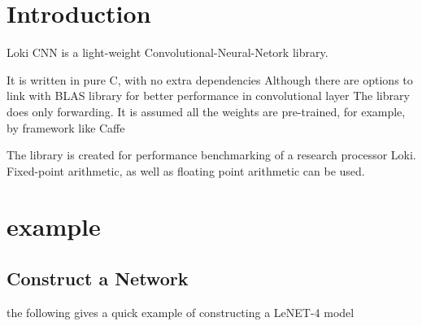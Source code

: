 \hypertarget{index_intro_sec}{}\section{Introduction}\label{index_intro_sec}
Loki C\+NN is a light-\/weight Convolutional-\/\+Neural-\/\+Netork library.

It is written in pure C, with no extra dependencies Although there are options to link with B\+L\+AS library for better performance in convolutional layer The library does only forwarding. It is assumed all the weights are pre-\/trained, for example, by framework like Caffe

The library is created for performance benchmarking of a research processor Loki. Fixed-\/point arithmetic, as well as floating point arithmetic can be used.\hypertarget{index_example}{}\section{example}\label{index_example}
\hypertarget{index_step1}{}\subsection{Construct a Network}\label{index_step1}
the following gives a quick example of constructing a Le\+N\+E\+T-\/4 model


